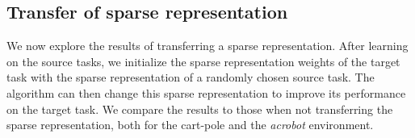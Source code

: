 
\subsection{Transfer of sparse representation} %
\label{sub:with_sparse_representation_transfer}
We now explore the results of transferring a sparse representation.
After learning on the source tasks, we initialize the sparse representation weights of the target task with the sparse representation of a randomly chosen source task.
The algorithm can then change this sparse representation to improve its performance on the target task.
We compare the results to those when not transferring the sparse representation, both for the cart-pole and the \textit{acrobot} environment.
